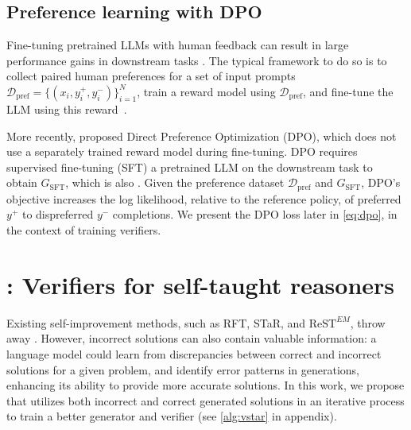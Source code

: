 \subsection{Preference learning with DPO}
\label{sec:dpo_obj}
Fine-tuning pretrained LLMs with human feedback can result in large performance gains in downstream tasks \cite{DBLP:conf/nips/Ouyang0JAWMZASR22, bai2022constitutional}. The typical framework to do so is to collect paired human preferences for a set of input prompts $\mathcal{D}_{\text{pref}} = \{(x_i,y_i^{+}, y_i^{-})\}_{i=1}^{N}$, 
train a reward model using $\mathcal{D}_{\text{pref}}$, and fine-tune the LLM using this reward~\citep{DBLP:journals/corr/abs-2009-01325}.

More recently, \citet{rafailov2023direct} proposed Direct Preference Optimization (DPO), which does not use a separately trained reward model during fine-tuning. DPO requires supervised fine-tuning (SFT) a pretrained LLM on the downstream task to obtain $G_{\text{SFT}}$, which is also . 
Given the preference dataset $\mathcal{D}_{\text{pref}}$ and $G_{\text{SFT}}$, DPO's objective increases the log likelihood, relative to the reference policy,  of preferred $y^+$ to dispreferred $y^-$ completions. We present the DPO loss later in \autoref{eq:dpo}, in the context of training verifiers.






\section{\vstar{}: Verifiers for self-taught reasoners}

Existing self-improvement methods, such as RFT, STaR, and $\text{ReST}^{EM}$, throw away . However, incorrect solutions can also contain valuable information: a language model could learn from discrepancies between correct and incorrect solutions for a given problem, and identify error patterns in generations, enhancing its ability to provide more accurate solutions.  
In this work, we propose \textbf{\vstar{}} that utilizes both incorrect and correct generated solutions in an iterative process to train a better generator and verifier (see \autoref{alg:vstar} in appendix).   


